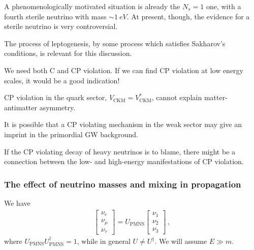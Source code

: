 \documentclass[main.tex]{subfiles}
\begin{document}
A phenomenologically motivated situation is already the \(N_s = 1\) one, 
with a fourth sterile neutrino with mass \(\sim \SI{1}{eV}\). 
At present, though, the evidence for a sterile neutrino is very controversial. 

The process of leptogenesis, by some process which satisfies Sakharov's conditions, is relevant for this discussion. 

We need both C and CP violation. 
If we can find CP violation at low energy scales, it would be a good indication! 

CP violation in the quark sector, \(V _{\text{CKM}} = V^{*} _{\text{CKM}}\), cannot explain matter-antimatter asymmetry.

It is possible that a CP violating mechanism in the weak sector may give an imprint in the primordial GW background. 

If the CP violating decay of heavy neutrinos is to blame, there might be a connection between the low- and high-energy manifestations of CP violation. 

\subsubsection{The effect of neutrino masses and mixing in propagation}

We have 
%
\begin{align}
\left[\begin{array}{c}
\nu _e \\ 
\nu _\mu  \\ 
\nu _\tau 
\end{array}\right]
= 
U _{\text{PMNS}} 
\left[\begin{array}{c}
\nu_1   \\ 
\nu_2  \\ 
\nu_3 
\end{array}\right]
\,,
\end{align}
%
where \(U _{\text{PMNS}} U _{\text{PMNS}} ^\dag = 1\), while in general \(U \neq U ^\dag\). 
We will assume \(E \gg m \). 
\end{document}
